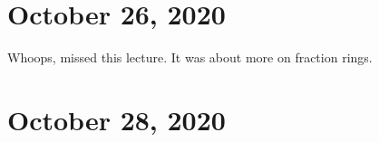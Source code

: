 \section{October 26, 2020}
Whoops, missed this lecture. It was about more on fraction rings.
\section{October 28, 2020}
